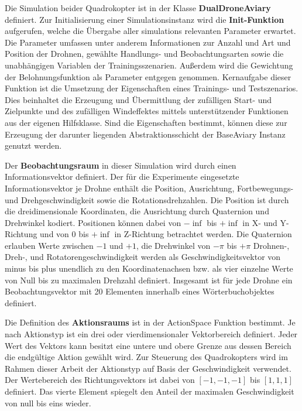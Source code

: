 Die Simulation beider Quadrokopter ist in der Klasse \textbf{DualDroneAviary} definiert.
Zur Initialisierung einer Simulationsinstanz wird die \textbf{Init-Funktion} aufgerufen, welche die Übergabe aller simulations relevanten Parameter erwartet.
Die Parameter umfassen unter anderem Informationen zur Anzahl und Art und Position der Drohnen, gewählte Handlungs- und Beobachtungsarten sowie die unabhängigen Variablen der Trainingsszenarien.
Außerdem wird die Gewichtung der Belohnungsfunktion als Parameter entgegen genommen.
Kernaufgabe dieser Funktion ist die Umsetzung der Eigenschaften eines Trainings- und Testszenarios.
Dies beinhaltet die Erzeugung und Übermittlung der zufälligen Start- und Zielpunkte und des zufälligen Windeffektes mittels unterstützender Funktionen aus der eigenen Hilfsklasse.
Sind die Eigenschaften bestimmt, können diese zur Erzeugung der darunter liegenden Abstraktionsschicht der BaseAviary Instanz genutzt werden.

Der \textbf{Beobachtungsraum} in dieser Simulation wird durch einen Informationsvektor definiert.
Der für die Experimente eingesetzte Informationsvektor je Drohne enthält die Position, Ausrichtung, Fortbewegungs- und Drehgeschwindigkeit sowie die Rotationsdrehzahlen.
Die Position ist durch die dreidimensionale Koordinaten, die Ausrichtung durch Quaternion und Drehwinkel kodiert.
Positionen können dabei von $- \inf$ bis $+ \inf$ in X- und Y-Richtung und von $0$ bis $+ \inf$ in Z-Richtung betrachtet werden.
Die Quaternion erlauben Werte zwischen $-1$ und $+1$, die Drehwinkel von $- \pi$ bis $+ \pi$
Drohnen-, Dreh-, und Rotatorengeschwindigkeit werden als Geschwindigkeitsvektor von minus bis plus unendlich zu den Koordinatenachsen bzw. als vier einzelne Werte von Null bis zu maximalen Drehzahl definiert.
Insgesamt ist für jede Drohne ein Beobachtungsvektor mit 20 Elementen innerhalb eines Wörterbuchobjektes definiert.

Die Definition des \textbf{Aktionsraums} ist in der ActionSpace Funktion bestimmt.
Je nach Aktionstyp ist ein drei oder vierdimensionaler Vektorbereich definiert.
Jeder Wert des Vektors kann besitzt eine untere und obere Grenze aus dessen Bereich die endgültige Aktion gewählt wird.
Zur Steuerung des Quadrokopters wird im Rahmen dieser Arbeit der Aktionstyp auf Basis der Geschwindigkeit verwendet.
Der Wertebereich des Richtungsvektors ist dabei von $[-1,-1,-1]$ bis $[1,1,1]$ definiert. 
Das vierte Element spiegelt den Anteil der maximalen Geschwindigkeit von null bis eins wieder.


